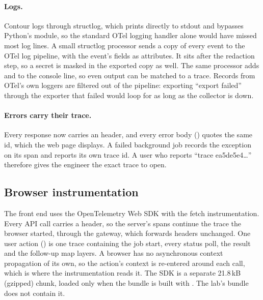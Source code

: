 \documentclass[11pt,a4paper]{article}
\begin{document}
\paragraph{Logs.}
Contour logs through structlog, which prints directly to stdout and bypasses Python's
 module, so the standard OTel logging handler alone would have missed most log
lines. A small structlog processor sends a copy of every event to the OTel log pipeline, with the
event's fields as attributes. It sits after the redaction step, so a secret is masked in the
exported copy as well. The same processor adds  and  to the console
line, so even  output can be matched to a trace. Records from OTel's own
loggers are filtered out of the pipeline: exporting ``export failed'' through the exporter that
failed would loop for as long as the collector is down.

\paragraph{Errors carry their trace.}
Every response now carries an  header, and every error body
() quotes the same id, which the web page displays. A failed
background job records the exception on its span and reports its own trace id. A user who
reports ``trace ea5de5e4\ldots'' therefore gives the engineer the exact trace to open.

\subsection{Browser instrumentation}
The front end uses the OpenTelemetry Web SDK with the fetch instrumentation. Every API call
carries a  header, so the server's spans continue the trace the browser
started, through the gateway, which forwards headers unchanged. One user action ()
is one trace containing the job start, every status poll, the result and the follow-up map
layers. A browser has no asynchronous context propagation of its own, so the action's context is
re-entered around each  call, which is where the instrumentation reads it. The SDK
is a separate 21.8\,kB (gzipped) chunk, loaded only when the bundle is built with
. The lab's bundle does not contain it.
\end{document}
